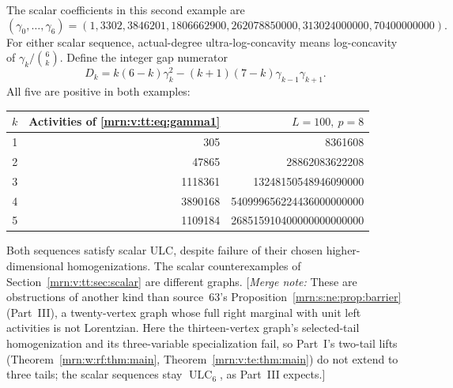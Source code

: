 \documentclass[11pt,a4paper]{article}
\theoremstyle{remark}\newtheorem{remark}[theorem]{Remark}
\newcommand{\ULC}{\operatorname{ULC}}      %
\newcommand{\mnote}[1]{[\textit{Merge note:} #1]}
\begin{document}
The scalar coefficients in this second example are
\[
 (\gamma_0,\ldots,\gamma_6)=
 (1,3302,3846201,1806662900,262078850000,313024000000,70400000000).
\]
For either scalar sequence, actual-degree ultra-log-concavity means log-concavity of $\gamma_k/\binom6k$. Define the integer gap numerator
\[
 D_k=k(6-k)\gamma_k^2-(k+1)(7-k)\gamma_{k-1}\gamma_{k+1}.
\]
All five are positive in both examples:
\begin{center}\small
\begin{tabular}{@{}rrr@{}}\toprule
$k$&Activities of \eqref{mrn:v:tt:eq:gamma1}&$L=100,\ p=8$\\\midrule
1&305&8361608\\
2&47865&28862083622208\\
3&1118361&13248150548946090000\\
4&3890168&540999656224436000000000\\
5&1109184&268515910400000000000000\\\bottomrule
\end{tabular}
\end{center}
Both sequences satisfy scalar ULC, despite failure of their chosen higher-dimensional homogenizations. The scalar counterexamples of Section~\ref{mrn:v:tt:sec:scalar} are different graphs.
\mnote{These are obstructions of another kind than source~63's
Proposition~\ref{mrn:s:ne:prop:barrier} (Part~III), a twenty-vertex graph whose
full right marginal with unit left activities is not Lorentzian. Here the
thirteen-vertex graph's selected-tail homogenization and its three-variable
specialization fail, so Part~I's two-tail lifts (Theorem~\ref{mrn:w:rf:thm:main},
Theorem~\ref{mrn:v:te:thm:main}) do not extend to three tails; the scalar
sequences stay $\ULC_6$, as Part~III expects.}
\end{document}
